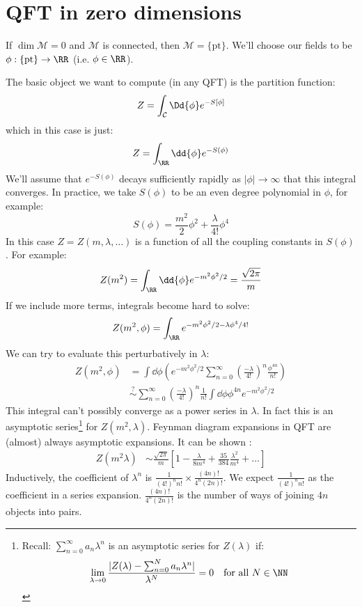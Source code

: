 \documentclass{jknotes}
\begin{document}
\section{QFT in zero dimensions}
If \(\dim \mathcal{M} = 0\) and \(\mathcal{M}\) is connected, then \(\mathcal{M}=\{\text{pt}\}\). We'll choose our fields to be \(\phi:\{\text{pt}\}\rightarrow\RR\) (i.e. \(\phi\in\RR\)).

The basic object we want to compute (in any QFT) is the partition function:
\begin{equation}
    Z = \int_\mathcal{C} \Dd{\phi} e^{-S[\phi]}
\end{equation}
which in this case is just:
\begin{equation}
    Z = \int_\RR \dd{\phi} e^{-S(\phi)}
\end{equation}
We'll assume that \(e^{-S(\phi)}\) decays sufficiently rapidly as \(|\phi|\rightarrow\infty\) that this integral converges. In practice, we take \(S(\phi)\) to be an even degree polynomial in \(\phi\), for example:
\begin{equation}
    S(\phi) = \frac{m^2}{2}\phi^2 + \frac{\lambda}{4!}\phi^4
\end{equation}
In this case \(Z=Z(m,\lambda,\dots)\) is a function of all the coupling constants in \(S(\phi)\). For example:
\begin{equation}
    Z(m^2) = \int_\RR \dd{\phi}e^{-m^2\phi^2/2} = \frac{\sqrt{2\pi}}{m}
\end{equation}
If we include more terms, integrals become hard to solve:
\begin{equation}
    Z(m^2,\phi) = \int_\RR e^{-m^2\phi^2/2-\lambda\phi^4/4!}
\end{equation}
We can try to evaluate this perturbatively in \(\lambda\):
\begin{align}
    Z(m^2,\phi) &= \int \dd{\phi} \left( e^{-m^2\phi^2/2} \sum_{n=0}^\infty \left( \frac{-\lambda}{4!} \right)^n\frac{\phi^{4n}}{n!} \right)\\
    &\stackrel{?}{\sim} \sum_{n=0}^\infty \left( \frac{-\lambda}{4!} \right)^n\frac{1}{n!}\int\dd{\phi}\phi^{4n}e^{-m^2\phi^2/2}
\end{align}
This integral can't possibly converge as a power series in \(\lambda\). In fact this is an asymptotic series\footnote{
    Recall: \(\sum_{n=0}^\infty a_n\lambda^n\) is an asymptotic series for \(Z(\lambda)\) if:
    \begin{equation}
        \lim_{\lambda\rightarrow 0} \frac{|Z(\lambda)-\sum_{n=0}^Na_n\lambda^n|}{\lambda^N}=0 \quad \text{for all } N\in\NN
    \end{equation}
} for \(Z(m^2,\lambda)\). Feynman diagram expansions in QFT are (almost) always asymptotic expansions. It can be shown :
\begin{align}
    Z(m^2\lambda) &\sim \frac{\sqrt{2\pi}}{m}\left[ 1-\frac{\lambda}{8m^4} + \frac{35}{384}\frac{\lambda^2}{m^4} + \dots \right]
\end{align}
Inductively, the coefficient of \(\lambda^n\) is \(\frac{1}{(4!)^nn!}\times\frac{(4n)!}{4^n(2n)!}\). We expect \(\frac{1}{(4!)^nn!}\) as the coefficient in a series expansion. \(\frac{(4n)!}{4^n(2n)!}\) is the number of ways of joining \(4n\) objects into pairs.
\end{document}
